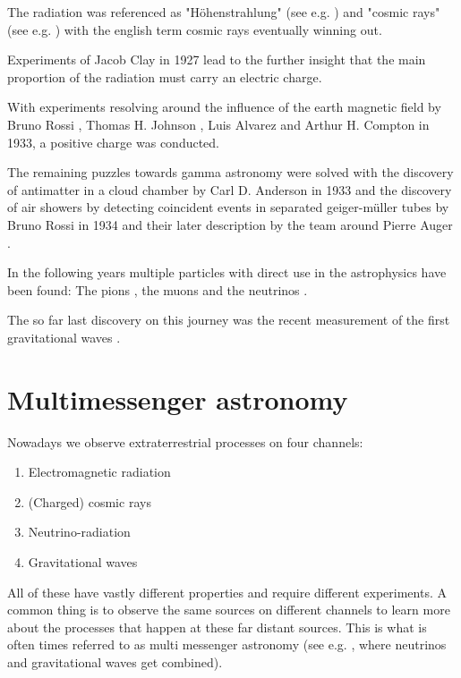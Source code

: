 The radiation was referenced as "Höhenstrahlung" 
(see e.g. \cite{myssowsky1926versuche}) 
and "cosmic rays" (see e.g. \cite{millikan1928origin}) with 
the english term cosmic rays eventually winning out.

Experiments of Jacob Clay in 1927 
\cite{clay1927penetrating}
lead to the further insight that the main proportion of 
the radiation must carry an electric charge.

With experiments resolving around the influence of the earth magnetic 
field by 
Bruno Rossi \cite{Rossi1933},
Thomas H. Johnson \cite{PhysRev.43.834},
Luis Alvarez and Arthur H. Compton \cite{PhysRev.43.835}
in 1933,
a positive charge was conducted.

The remaining puzzles towards gamma astronomy were 
solved with the discovery of antimatter in a cloud chamber
by Carl D. Anderson in 1933
\cite{PhysRev.43.491}
and the discovery of air showers by detecting coincident 
events in separated geiger-müller tubes by 
Bruno Rossi in 1934
\cite{PhysRev.45.212}
and their later description by
the team around Pierre Auger 
\cite{RevModPhys.11.288}.

In the following years multiple particles with direct use in the 
astrophysics have been found:
The pions \cite{LATTES1947}, the muons \cite{PhysRev.52.1003}
and the neutrinos \cite{Cowan103}.

The so far last discovery on this journey
was the recent measurement of the first gravitational 
waves \cite{PhysRevLett.118.221101}.

\section{Multimessenger astronomy}

Nowadays we observe extraterrestrial processes on four channels: 
\begin{enumerate}
	\item Electromagnetic radiation
	\item (Charged) cosmic rays
	\item Neutrino-radiation
	\item Gravitational waves
\end{enumerate}

All of these have vastly different properties and require different experiments.
A common thing is to observe the same sources 
on different channels to learn more about the processes that happen at 
these far distant sources. This is what is often times 
referred to as multi messenger astronomy (see e.g. \cite{RevModPhys.85.1401}, where
neutrinos and gravitational waves get combined).

